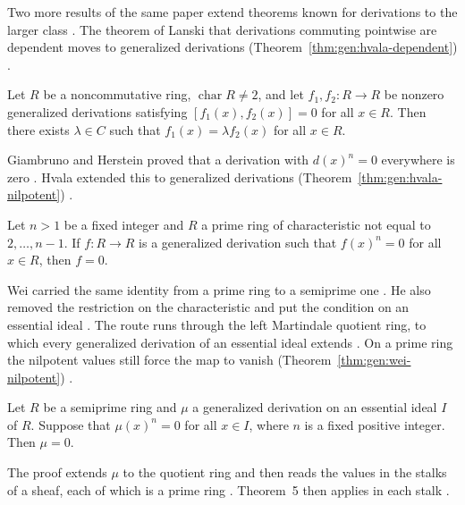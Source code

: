 Two more results of the same paper extend theorems known for derivations to
the larger class \cite[pp.~1148, 1153, 1159]{Hvala1998}. The theorem of Lanski
that derivations commuting pointwise are dependent moves to generalized
derivations (Theorem~\ref{thm:gen:hvala-dependent}) \cite[p.~1148]{Hvala1998}.

\begin{theorem}\label{thm:gen:hvala-dependent}
Let $R$ be a noncommutative ring, $\operatorname{char}R\neq 2$, and let
$f_{1},f_{2}\colon R\to R$ be nonzero generalized derivations satisfying
$[f_{1}(x),f_{2}(x)]=0$ for all $x\in R$. Then there exists $\lambda\in C$
such that $f_{1}(x)=\lambda f_{2}(x)$ for all $x\in R$.
\end{theorem}

Giambruno and Herstein proved that a derivation with $d(x)^{n}=0$ everywhere
is zero \cite{GiambrunoHerstein1981}. Hvala extended this to generalized
derivations (Theorem~\ref{thm:gen:hvala-nilpotent}) \cite[p.~1148]{Hvala1998}.

\begin{theorem}\label{thm:gen:hvala-nilpotent}
Let $n>1$ be a fixed integer and $R$ a prime ring of characteristic not
equal to $2,\dots,n-1$. If $f\colon R\to R$ is a generalized derivation such
that $f(x)^{n}=0$ for all $x\in R$, then $f=0$.
\end{theorem}

Wei carried the same identity from a prime ring to a semiprime one
\cite[p.~453]{Wei2004}. He also removed the restriction on the characteristic and
put the condition on an essential ideal \cite[p.~453]{Wei2004}. The route runs
through the left Martindale quotient ring, to which every generalized derivation
of an essential ideal extends \cite[Theorem~2, p.~455]{Wei2004}. On a prime ring
the nilpotent values still force the map to vanish (Theorem~\ref{thm:gen:wei-nilpotent})
\cite[Theorem~5, p.~457]{Wei2004}.\begin{theorem}\label{thm:gen:wei-nilpotent}
Let $R$ be a semiprime ring and $\mu$ a generalized derivation on an essential
ideal $I$ of $R$. Suppose that $\mu(x)^{n}=0$ for all $x\in I$, where $n$ is a fixed
positive integer. Then $\mu=0$.
\end{theorem}

The proof extends $\mu$ to the quotient ring and then reads the values in the
stalks of a sheaf, each of which is a prime ring \cite[p.~460]{Wei2004}.
Theorem~5 then applies in each stalk \cite[p.~460]{Wei2004}.

